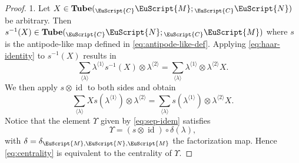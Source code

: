 \documentclass[a4paper,11pt]{article}
\theoremstyle{definition}
\theoremstyle{remark}
\newcommand\eC           {\EuScript{C}}
\newcommand\eM          {\EuScript{M}}
\newcommand\eN         {\EuScript{N}}
\newcommand{\id}{\operatorname{id}}
\begin{document}
\begin{proof}
    1. Let $X\in \mathbf{Tube}({_{\eC}}\eM;{_{\eC}}\eN)$ be arbitrary. Then $s^{-1}(X)\in \mathbf{Tube}({_{\eC}}\eN;{_{\eC}}\eM)$ where $s$ is the antipode-like map defined in \eqref{eq:antipode-like-def}.  Applying \eqref{eq:haar-identity} to $s^{-1}(X)$ results in 
    \begin{equation} 
        \sum_{\langle \lambda \rangle}\lambda^{\langle 1 \rangle} s^{-1}(X)\otimes \lambda^{\langle 2 \rangle} = \sum_{\langle \lambda \rangle}\lambda^{\langle 1 \rangle} \otimes \lambda^{\langle 2 \rangle} X. 
    \end{equation}
    We then apply $s\otimes \id$ to both sides and obtain
    \begin{equation} \label{eq:centrality}
        \sum_{\langle \lambda \rangle}Xs(\lambda^{\langle 1 \rangle})\otimes \lambda^{\langle 2 \rangle} = \sum_{\langle \lambda \rangle}s(\lambda^{\langle 1 \rangle}) \otimes \lambda^{\langle 2 \rangle} X. 
    \end{equation}
    Notice that the element $\Upsilon$ given by \eqref{eq:sep-idem} satisfies 
    \begin{equation}
        \Upsilon = (s\otimes \id)\circ \delta (\lambda),
    \end{equation}
    with $\delta=\delta_{\eM,\eN,\eM}$ the factorization map. Hence \eqref{eq:centrality} is equivalent to the centrality of $\Upsilon$. 
        

\end{proof}
\end{document}
